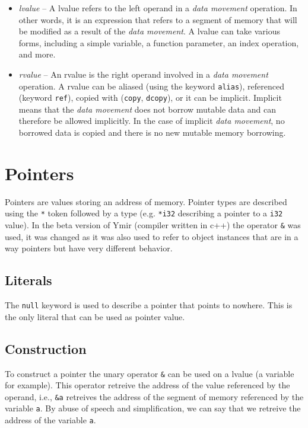 \begin{itemize}
\item \textit{lvalue} -- A lvalue refers to the left operand in a \textit{data
  movement} operation. In other words, it is an expression that refers to a
  segment of memory that will be modified as a result of the \textit{data
    movement}. A lvalue can take various forms, including a simple variable, a
  function parameter, an index operation, and more.

\item \textit{rvalue} -- An rvalue is the right operand involved in a
  \textit{data movement} operation. A rvalue can be aliased (using the keyword
  \texttt{alias}), referenced (keyword \texttt{ref}), copied with
  (\texttt{copy}, \texttt{dcopy}), or it can be implicit. Implicit means that
  the \textit{data movement} does not borrow mutable data and can therefore be
  allowed implicitly. In the case of implicit \textit{data movement}, no
  borrowed data is copied and there is no new mutable memory borrowing.

\end{itemize}

\section{Pointers}

Pointers are values storing an address of memory. Pointer types are described
using the \texttt{*} token followed by a type (e.g. \texttt{*i32} describing a
pointer to a \texttt{i32} value). In the beta version of Ymir (compiler written
in c++) the operator \texttt{\&} was used, it was changed as it was also used to
refer to object instances that are in a way pointers but have very different
behavior.

\subsection {Literals}

The \texttt{null} keyword is used to describe a pointer that points to nowhere.
This is the only literal that can be used as pointer value.

\subsection {Construction}

To construct a pointer the unary operator \texttt{\&} can be used on a lvalue (a
variable for example). This operator retreive the address of the value
referenced by the operand, i.e., \texttt{\&a} retreives the address of the
segment of memory referenced by the variable \texttt{a}. By abuse of speech and
simplification, we can say that we retreive the address of the variable
\texttt{a}.

